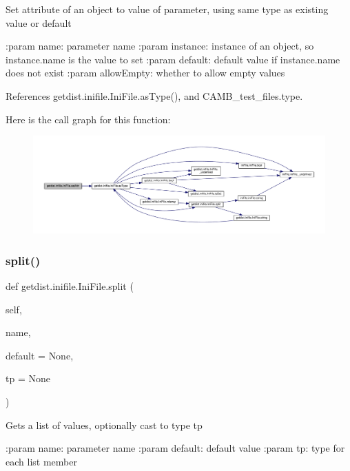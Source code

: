 \begin{DoxyVerb}Set attribute of an object to value of parameter, using same type as existing value or default

:param name: parameter name
:param instance: instance of an object, so instance.name is the value to set
:param default: default value if instance.name does not exist
:param allowEmpty: whether to allow empty values
\end{DoxyVerb}
 

References getdist.\+inifile.\+Ini\+File.\+as\+Type(), and C\+A\+M\+B\+\_\+test\+\_\+files.\+type.

Here is the call graph for this function\+:
\nopagebreak
\begin{figure}[H]
\begin{center}
\leavevmode
\includegraphics[width=350pt]{classgetdist_1_1inifile_1_1IniFile_ab0aec3357b710594c342466f6c12762a_cgraph}
\end{center}
\end{figure}
\mbox{\label{classgetdist_1_1inifile_1_1IniFile_a3a4d9c8fd7a2274730473c3df2f5a44e}} 
\subsubsection{\texorpdfstring{split()}{split()}}
{\footnotesize\ttfamily def getdist.\+inifile.\+Ini\+File.\+split (\begin{DoxyParamCaption}\item[{}]{self,  }\item[{}]{name,  }\item[{}]{default = {\ttfamily None},  }\item[{}]{tp = {\ttfamily None} }\end{DoxyParamCaption})}

\begin{DoxyVerb}Gets a list of values, optionally cast to type tp

:param name: parameter name
:param default: default value
:param tp: type for each list member
\end{DoxyVerb}
 

